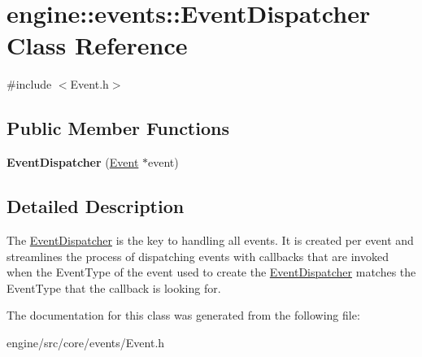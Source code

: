 \hypertarget{classengine_1_1events_1_1EventDispatcher}{}\section{engine\+:\+:events\+:\+:Event\+Dispatcher Class Reference}
\label{classengine_1_1events_1_1EventDispatcher}


{\ttfamily \#include $<$Event.\+h$>$}

\subsection*{Public Member Functions}
\begin{DoxyCompactItemize}
\item 
\mbox{\label{classengine_1_1events_1_1EventDispatcher_a1a599ea2862fbf8ccff7510b3d1356f0}} 
{\bfseries Event\+Dispatcher} (\hyperlink{classengine_1_1events_1_1Event}{Event} $\ast$event)
\end{DoxyCompactItemize}


\subsection{Detailed Description}
The \hyperlink{classengine_1_1events_1_1EventDispatcher}{Event\+Dispatcher} is the key to handling all events. It is created per event and streamlines the process of dispatching events with callbacks that are invoked when the Event\+Type of the event used to create the \hyperlink{classengine_1_1events_1_1EventDispatcher}{Event\+Dispatcher} matches the Event\+Type that the callback is looking for. 

The documentation for this class was generated from the following file\+:\begin{DoxyCompactItemize}
\item 
engine/src/core/events/Event.\+h\end{DoxyCompactItemize}
